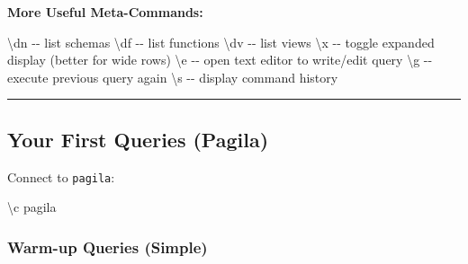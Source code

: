 \documentclass[
  letterpaper,
  DIV=11,
  numbers=noendperiod]{scrartcl}
\newenvironment{Shaded}{\begin{snugshade}}{\end{snugshade}}
\newcommand{\CommentTok}[1]{\textcolor[rgb]{0.37,0.37,0.37}{#1}}
\newcommand{\NormalTok}[1]{\textcolor[rgb]{0.00,0.23,0.31}{#1}}
\begin{document}
\textbf{More Useful Meta-Commands:}

\begin{Shaded}
\begin{Highlighting}[]
\NormalTok{\textbackslash{}dn                }\CommentTok{{-}{-} list schemas}
\NormalTok{\textbackslash{}df                }\CommentTok{{-}{-} list functions}
\NormalTok{\textbackslash{}dv                }\CommentTok{{-}{-} list views}
\NormalTok{\textbackslash{}x                 }\CommentTok{{-}{-} toggle expanded display (better for wide rows)}
\NormalTok{\textbackslash{}e                 }\CommentTok{{-}{-} open text editor to write/edit query}
\NormalTok{\textbackslash{}g                 }\CommentTok{{-}{-} execute previous query again}
\NormalTok{\textbackslash{}s                 }\CommentTok{{-}{-} display command history}
\end{Highlighting}
\end{Shaded}

\begin{center}\rule{0.5\linewidth}{0.5pt}\end{center}

\subsection{Your First Queries
(Pagila)}\label{your-first-queries-pagila}

Connect to \texttt{pagila}:

\begin{Shaded}
\begin{Highlighting}[]
\NormalTok{\textbackslash{}c pagila}
\end{Highlighting}
\end{Shaded}

\subsubsection{Warm-up Queries (Simple)}\label{warm-up-queries-simple}
\end{document}
